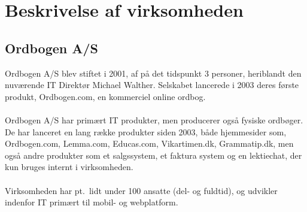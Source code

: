 \section{Beskrivelse af virksomheden}
\subsection{Ordbogen A/S}
Ordbogen A/S blev stiftet i 2001, af på det tidspunkt 3 personer, heriblandt den nuværende IT Direktør Michael Walther. Selskabet lancerede i 2003 deres første produkt, Ordbogen.com, en kommerciel online ordbog.
\\\\
Ordbogen A/S har primært IT produkter, men producerer også fysiske ordbøger. De har lanceret en lang række produkter siden 2003, både hjemmesider som, Ordbogen.com, Lemma.com, Educas.com, Vikartimen.dk, Grammatip.dk,
men også andre produkter som et salgssystem, et faktura system og en lektiechat, der kun bruges internt i virksomheden.
\\\\
Virksomheden har pt.\ lidt under 100 ansatte (del- og fuldtid), og udvikler indenfor IT primært til mobil- og webplatform.
